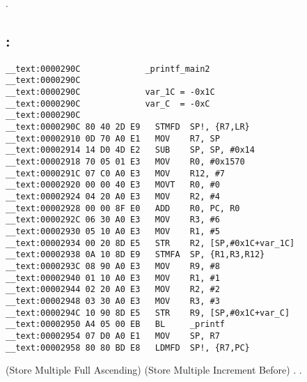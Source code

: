 .

\subsection{\OptimizingXcode: \ARMMode}

\begin{lstlisting}
__text:0000290C             _printf_main2
__text:0000290C
__text:0000290C             var_1C = -0x1C
__text:0000290C             var_C  = -0xC
__text:0000290C
__text:0000290C 80 40 2D E9   STMFD  SP!, {R7,LR}
__text:00002910 0D 70 A0 E1   MOV    R7, SP
__text:00002914 14 D0 4D E2   SUB    SP, SP, #0x14
__text:00002918 70 05 01 E3   MOV    R0, #0x1570
__text:0000291C 07 C0 A0 E3   MOV    R12, #7
__text:00002920 00 00 40 E3   MOVT   R0, #0
__text:00002924 04 20 A0 E3   MOV    R2, #4
__text:00002928 00 00 8F E0   ADD    R0, PC, R0
__text:0000292C 06 30 A0 E3   MOV    R3, #6
__text:00002930 05 10 A0 E3   MOV    R1, #5
__text:00002934 00 20 8D E5   STR    R2, [SP,#0x1C+var_1C]
__text:00002938 0A 10 8D E9   STMFA  SP, {R1,R3,R12}
__text:0000293C 08 90 A0 E3   MOV    R9, #8
__text:00002940 01 10 A0 E3   MOV    R1, #1
__text:00002944 02 20 A0 E3   MOV    R2, #2
__text:00002948 03 30 A0 E3   MOV    R3, #3
__text:0000294C 10 90 8D E5   STR    R9, [SP,#0x1C+var_C]
__text:00002950 A4 05 00 EB   BL     _printf
__text:00002954 07 D0 A0 E1   MOV    SP, R7
__text:00002958 80 80 BD E8   LDMFD  SP!, {R7,PC}
\end{lstlisting}

  (Store Multiple Full Ascending) 
 (Store Multiple Increment Before) . 
.

